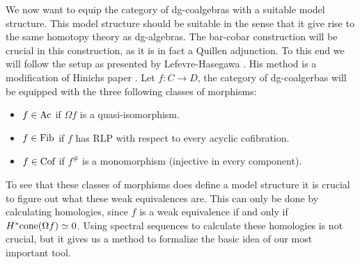 \documentclass[../thesis.tex]{subfiles}
\begin{document}
            We now want to equip the category of dg-coalgebras with a suitable model structure. This model structure should be suitable in the sense that it give rise to the same homotopy theory as dg-algebras. The bar-cobar construction will be crucial in this construction, as it is in fact a Quillen adjunction. To this end we will follow the setup as presented by Lefevre-Hasegawa \cite{LefevreHasegawa03}. His method is a modification of Hinichs paper \cite{Hinich01}.
            Let $f: C \rightarrow D$, the category of dg-coalgerbas will be equipped with the three following classes of morphisms:
            \begin{itemize}
                \item $f\in \tt{Ac}$ if $\Omega f$ is a quasi-isomorphism.
                \item $f\in \tt{Fib}$ if $f$ has RLP with respect to every acyclic cofibration.
                \item $f\in \tt{Cof}$ if $f^\#$ is a monomorphism (injective in every component).
            \end{itemize}



            To see that these classes of morphisms does define a model structure it is crucial to figure out what these weak equivalences are. This can only be done by calculating homologies, since $f$ is a weak equivalence if and only if $H^*\tt{cone}(\Omega f) \simeq 0$. Using spectral sequences to calculate these homologies is not crucial, but it gives us a method to formalize the basic idea of our most important tool.
\end{document}
